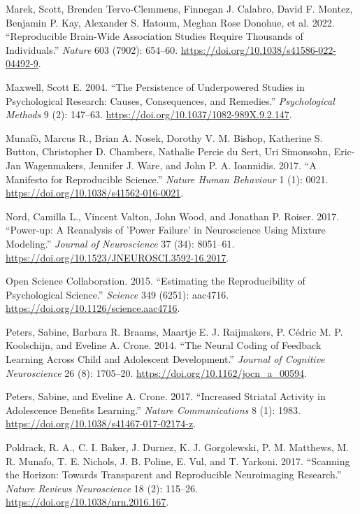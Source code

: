 \documentclass[
  letterpaper,
  DIV=11,
  numbers=noendperiod]{scrartcl}
\newlength{\cslhangindent}
\newenvironment{CSLReferences}[2] %
 {\begin{list}{}{%
  \setlength{\itemindent}{0pt}
  \setlength{\leftmargin}{0pt}
  \setlength{\parsep}{0pt}
  \ifodd #1
   \setlength{\leftmargin}{\cslhangindent}
   \setlength{\itemindent}{-1\cslhangindent}
  \fi
  \setlength{\itemsep}{#2\baselineskip}}}
 {\end{list}}
\begin{document}
\begin{CSLReferences}{1}{0}
Marek, Scott, Brenden Tervo-Clemmens, Finnegan J. Calabro, David F.
Montez, Benjamin P. Kay, Alexander S. Hatoum, Meghan Rose Donohue, et
al. 2022. {``Reproducible Brain-Wide Association Studies Require
Thousands of Individuals.''} \emph{Nature} 603 (7902): 654--60.
\url{https://doi.org/10.1038/s41586-022-04492-9}.

Maxwell, Scott E. 2004. {``The Persistence of Underpowered Studies in
Psychological Research: Causes, Consequences, and Remedies.''}
\emph{Psychological Methods} 9 (2): 147--63.
\url{https://doi.org/10.1037/1082-989X.9.2.147}.

Munafò, Marcus R., Brian A. Nosek, Dorothy V. M. Bishop, Katherine S.
Button, Christopher D. Chambers, Nathalie Percie du Sert, Uri Simonsohn,
Eric-Jan Wagenmakers, Jennifer J. Ware, and John P. A. Ioannidis. 2017.
{``A Manifesto for Reproducible Science.''} \emph{Nature Human
Behaviour} 1 (1): 0021. \url{https://doi.org/10.1038/s41562-016-0021}.

Nord, Camilla L., Vincent Valton, John Wood, and Jonathan P. Roiser.
2017. {``Power-up: A Reanalysis of 'Power Failure' in Neuroscience Using
Mixture Modeling.''} \emph{Journal of Neuroscience} 37 (34): 8051--61.
\url{https://doi.org/10.1523/JNEUROSCI.3592-16.2017}.

Open Science Collaboration. 2015. {``Estimating the Reproducibility of
Psychological Science.''} \emph{Science} 349 (6251): aac4716.
\url{https://doi.org/10.1126/science.aac4716}.

Peters, Sabine, Barbara R. Braams, Maartje E. J. Raijmakers, P. Cédric
M. P. Koolschijn, and Eveline A. Crone. 2014. {``The Neural Coding of
Feedback Learning Across Child and Adolescent Development.''}
\emph{Journal of Cognitive Neuroscience} 26 (8): 1705--20.
\url{https://doi.org/10.1162/jocn_a_00594}.

Peters, Sabine, and Eveline A. Crone. 2017. {``Increased Striatal
Activity in Adolescence Benefits Learning.''} \emph{Nature
Communications} 8 (1): 1983.
\url{https://doi.org/10.1038/s41467-017-02174-z}.

Poldrack, R. A., C. I. Baker, J. Durnez, K. J. Gorgolewski, P. M.
Matthews, M. R. Munafo, T. E. Nichols, J. B. Poline, E. Vul, and T.
Yarkoni. 2017. {``Scanning the Horizon: Towards Transparent and
Reproducible Neuroimaging Research.''} \emph{Nature Reviews
Neuroscience} 18 (2): 115--26.
\url{https://doi.org/10.1038/nrn.2016.167}.


\end{CSLReferences}
\end{document}
